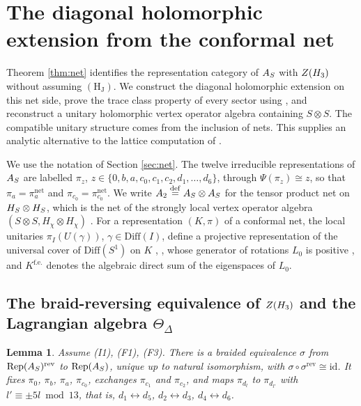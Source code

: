 \documentclass[leqno]{article}
\let\cal\relax
\newcommand{\cal}{\mathcal}
\newcommand{\ot}{\otimes}
\newcommand{\ov}{\overset}
\DeclareMathOperator{\Rep}{Rep}
\newtheorem{lemma}[thm]{Lemma}
\numberwithin{equation}{section}
\begin{document}
\section{The diagonal holomorphic extension from the conformal net}
\label{sec:diagonal}

Theorem \ref{thm:net} identifies the representation category of $\cal A_S$ with $Z(\cal H_3)$ without assuming $\mathrm{(H_J)}$. We construct the diagonal holomorphic extension on this net side, prove the trace class property of every sector using \cite{HeT26}, and reconstruct a unitary holomorphic vertex operator algebra containing $S\ot S$. The compatible unitary structure comes from the inclusion of nets. This supplies an analytic alternative to the lattice computation of \cite[Section 7.5]{ArhII}.

We use the notation of Section \ref{sec:net}. The twelve irreducible representations of $\cal A_S$ are labelled $\pi_z$, $z \in \{0,b,a,c_0,c_1,c_2,d_1,\ldots,d_6\}$, through $\Psi(\pi_z) \cong z$, so that $\pi_a = \pi^{\mathrm{net}}_a$ and $\pi_{c_0} = \pi^{\mathrm{net}}_{c_0}$. We write $\cal A_2 \ov{\mathrm{def}}{=} \cal A_S \ot \cal A_S$ for the tensor product net on $\cal H_S \ot \cal H_S$, which is the net of the strongly local vertex operator algebra $(S \ot S, H_\chi \ot H_\chi)$ \cite[Corollary 8.2 p.~62]{CKLW18}. For a representation $(K,\pi)$ of a conformal net, the local unitaries $\pi_I(U(\gamma))$, $\gamma \in \mathrm{Diff}(I)$, define a projective representation of the universal cover of $\mathrm{Diff}(S^1)$ on $K$ \cite[Section 2 p.~7--8]{HeT25}, \cite[Theorem 11]{Hen19}, whose generator of rotations $L_0$ is positive \cite[Proposition 3.8]{Wei06}, and $K^{\mathrm{f.e.}}$ denotes the algebraic direct sum of the eigenspaces of $L_0$.


\subsection{The braid-reversing equivalence of \texorpdfstring{$Z(\cal H_3)$}{Z(H3)} and the Lagrangian algebra \texorpdfstring{$\Theta_\Delta$}{Theta}}
\label{subsec:lagrangian-diagonal}

\begin{lemma}
\label{lem:sigma}
Assume \textup{(I1)}, \textup{(F1)}, \textup{(F3)}. There is a braided equivalence $\sigma$ from $\Rep(\cal A_S)^{\mathrm{rev}}$ to $\Rep(\cal A_S)$, unique up to natural isomorphism, with $\sigma \circ \sigma^{\mathrm{rev}} \cong \mathrm{id}$. It fixes $\pi_0$, $\pi_b$, $\pi_a$, $\pi_{c_0}$, exchanges $\pi_{c_1}$ and $\pi_{c_2}$, and maps $\pi_{d_l}$ to $\pi_{d_{l'}}$ with $l' \equiv \pm 5l \bmod 13$, that is, $d_1 \leftrightarrow d_5$, $d_2 \leftrightarrow d_3$, $d_4 \leftrightarrow d_6$.
\end{lemma}
\end{document}
